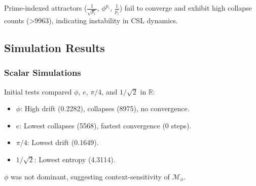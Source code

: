 \documentclass{article}
\theoremstyle{plain}
\begin{document}
\begin{corollary}
Prime-indexed attractors ($\frac{1}{\sqrt{p_i}}$, $\phi^{p_i}$, $\frac{1}{p_i}$) fail to converge and exhibit high collapse counts (>9963), indicating instability in CSL dynamics.
\end{corollary}

\subsection{Simulation Results}
\subsubsection{Scalar Simulations}
Initial tests compared $\phi$, $e$, $\pi/4$, and $1/\sqrt{2}$ in $\mathbb{R}$:
\begin{itemize}
    \item $\phi$: High drift (0.2282), collapses (8975), no convergence.
    \item $e$: Lowest collapses (5568), fastest convergence (0 steps).
    \item $\pi/4$: Lowest drift (0.1649).
    \item $1/\sqrt{2}$: Lowest entropy (4.3114).
\end{itemize}
$\phi$ was not dominant, suggesting context-sensitivity of $\mathcal{M}_\phi$.
\end{document}
